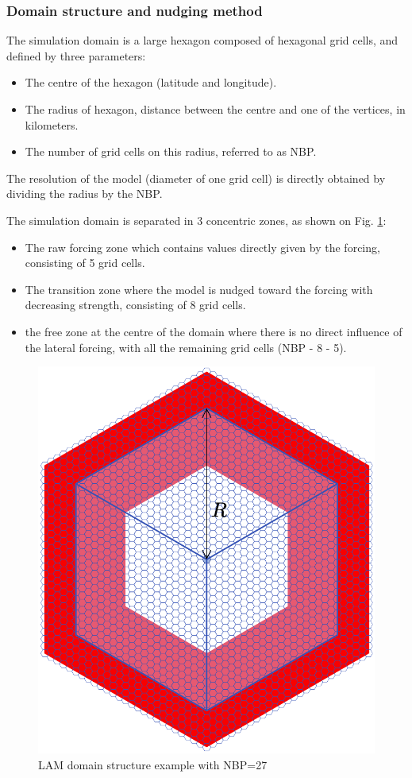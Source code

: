 

\subsubsection{Domain structure and nudging method}

The simulation domain is a large hexagon composed of hexagonal grid cells, and defined by three parameters:
\begin{itemize}
    \item The centre of the hexagon (latitude and longitude).
    \item The radius of hexagon, distance between the centre and one of the vertices, in kilometers.
    \item The number of grid cells on this radius, referred to as NBP.
\end{itemize}

The resolution of the model (diameter of one grid cell) is directly obtained by dividing the radius by the NBP.

\hfill

The simulation domain is separated in 3 concentric zones, as shown on Fig. \ref{fig:LAM_domain}: 
\begin{itemize}
    \item The raw forcing zone which contains values directly given by the forcing, consisting of 5 grid cells.
    \item The transition zone  where the model is nudged toward the forcing with decreasing strength, consisting of 8 grid cells.
    \item the free zone at the centre of the domain where there is no direct influence of the lateral forcing, with all the remaining grid cells (NBP - 8 - 5).
\end{itemize} 

\begin{figure}[ht]
    \centering
    \includegraphics[width=0.5\linewidth]{images/LAM_domain_zones.png}
    \caption{LAM domain structure example with NBP=27 \citep[from][]{raillard_leveraging_2024}}
    \label{fig:LAM_domain}
\end{figure}

